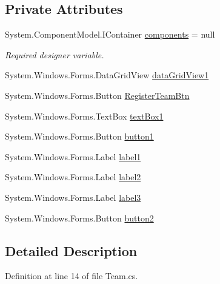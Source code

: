 \subsection*{Private Attributes}
\begin{DoxyCompactItemize}
\item 
System.\+Component\+Model.\+I\+Container \hyperlink{classProject__Codename__Olympia__v1_1_1__0_1_1TeamForm_a5ccf7bb8a7da37e1e2e0768dc2036957}{components} = null
\begin{DoxyCompactList}\small\item\em Required designer variable. \end{DoxyCompactList}\item 
System.\+Windows.\+Forms.\+Data\+Grid\+View \hyperlink{classProject__Codename__Olympia__v1_1_1__0_1_1TeamForm_a1df5a60789b3104197e5f2bb6aa0e8a0}{data\+Grid\+View1}
\item 
System.\+Windows.\+Forms.\+Button \hyperlink{classProject__Codename__Olympia__v1_1_1__0_1_1TeamForm_af72121943ac2b8ea1b0ab85279f5ff11}{Register\+Team\+Btn}
\item 
System.\+Windows.\+Forms.\+Text\+Box \hyperlink{classProject__Codename__Olympia__v1_1_1__0_1_1TeamForm_add4251fb22f1ffed01ba862f2280c2d1}{text\+Box1}
\item 
System.\+Windows.\+Forms.\+Button \hyperlink{classProject__Codename__Olympia__v1_1_1__0_1_1TeamForm_a617662f28a57702ea7e506f7b6c86f5b}{button1}
\item 
System.\+Windows.\+Forms.\+Label \hyperlink{classProject__Codename__Olympia__v1_1_1__0_1_1TeamForm_a354ee850069a92e952e6cc41130fd720}{label1}
\item 
System.\+Windows.\+Forms.\+Label \hyperlink{classProject__Codename__Olympia__v1_1_1__0_1_1TeamForm_a974f3add09256a36e4b2daffec3e535b}{label2}
\item 
System.\+Windows.\+Forms.\+Label \hyperlink{classProject__Codename__Olympia__v1_1_1__0_1_1TeamForm_a3f82a438e7a835e33108eec7a5f38c52}{label3}
\item 
System.\+Windows.\+Forms.\+Button \hyperlink{classProject__Codename__Olympia__v1_1_1__0_1_1TeamForm_ac97d40601d116000a31b6930a9f38eb9}{button2}
\end{DoxyCompactItemize}


\subsection{Detailed Description}


Definition at line 14 of file Team.\+cs.



